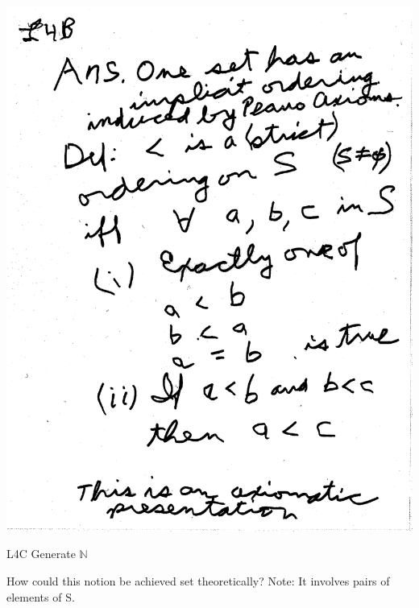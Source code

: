 \documentclass[10pt,a4paper]{article}
\begin{document}
\includegraphics[scale=0.5]{Pages/generateN2.pdf}

\newpage

\begin{Large}
L4C Generate $\mathbb{N}$
\end{Large}

How could this notion be achieved set theoretically? Note: It involves pairs of elements of S.
\end{document}

